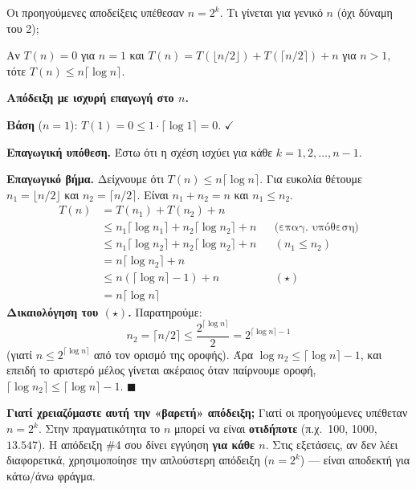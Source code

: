 \documentclass[11pt,a4paper]{article}
\begin{document}
Οι προηγούμενες αποδείξεις υπέθεσαν $n = 2^k$. Τι γίνεται για γενικό $n$ (όχι
δύναμη του 2);

\begin{theorem}
Αν $T(n) = 0$ για $n = 1$ και $T(n) = T(\lfloor n/2 \rfloor) + T(\lceil n/2
\rceil) + n$ για $n > 1$, τότε $T(n) \le n \lceil \log n \rceil$.
\end{theorem}

\textbf{Απόδειξη με ισχυρή επαγωγή στο $n$.}

\textbf{Βάση} ($n = 1$): $T(1) = 0 \le 1 \cdot \lceil \log 1 \rceil = 0$.
$\checkmark$

\textbf{Επαγωγική υπόθεση.} Έστω ότι η σχέση ισχύει για κάθε $k = 1, 2, \dots,
n-1$.

\textbf{Επαγωγικό βήμα.} Δείχνουμε ότι $T(n) \le n \lceil \log n \rceil$. Για
ευκολία θέτουμε $n_1 = \lfloor n/2 \rfloor$ και $n_2 = \lceil n/2 \rceil$. Είναι
$n_1 + n_2 = n$ και $n_1 \le n_2$.
\[
\begin{aligned}
T(n) &= T(n_1) + T(n_2) + n \\
     &\le n_1 \lceil \log n_1 \rceil + n_2 \lceil \log n_2 \rceil + n
        && \text{(επαγ.\ υπόθεση)} \\
     &\le n_1 \lceil \log n_2 \rceil + n_2 \lceil \log n_2 \rceil + n
        && (n_1 \le n_2) \\
     &= n \lceil \log n_2 \rceil + n \\
     &\le n (\lceil \log n \rceil - 1) + n && (\star) \\
     &= n \lceil \log n \rceil
\end{aligned}
\]
\textbf{Δικαιολόγηση του $(\star)$.} Παρατηρούμε:
\[
n_2 = \lceil n/2 \rceil \le \frac{2^{\lceil \log n \rceil}}{2} = 2^{\lceil \log n
\rceil - 1}
\]
(γιατί $n \le 2^{\lceil \log n \rceil}$ από τον ορισμό της οροφής). Άρα
$\log n_2 \le \lceil \log n \rceil - 1$, και επειδή το αριστερό μέλος γίνεται
ακέραιος όταν παίρνουμε οροφή, $\lceil \log n_2 \rceil \le \lceil \log n \rceil -
1$. $\blacksquare$

\begin{warningbox}
\textbf{Γιατί χρειαζόμαστε αυτή την «βαρετή» απόδειξη;} Γιατί οι προηγούμενες
υπέθεταν $n = 2^k$. Στην πραγματικότητα το $n$ μπορεί να είναι \textbf{οτιδήποτε}
(π.χ.\ 100, 1000, $13.547$). Η απόδειξη \#4 σου δίνει εγγύηση \textbf{για κάθε
$n$}. Στις εξετάσεις, αν δεν λέει διαφορετικά, χρησιμοποίησε την απλούστερη
απόδειξη ($n = 2^k$) --- είναι αποδεκτή για κάτω/άνω φράγμα.
\end{warningbox}
\end{document}
